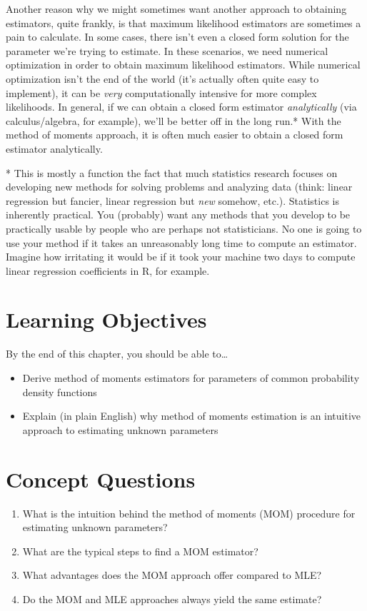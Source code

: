 \documentclass[
  letterpaper,
  DIV=11,
  numbers=noendperiod]{scrreprt}
\begin{document}
Another reason why we might sometimes want another approach to obtaining
estimators, quite frankly, is that maximum likelihood estimators are
sometimes a pain to calculate. In some cases, there isn't even a closed
form solution for the parameter we're trying to estimate. In these
scenarios, we need numerical optimization in order to obtain maximum
likelihood estimators. While numerical optimization isn't the end of the
world (it's actually often quite easy to implement), it can be
\emph{very} computationally intensive for more complex likelihoods. In
general, if we can obtain a closed form estimator \emph{analytically}
(via calculus/algebra, for example), we'll be better off in the long
run.* With the method of moments approach, it is often much easier to
obtain a closed form estimator analytically.

* This is mostly a function the fact that much statistics research
focuses on developing new methods for solving problems and analyzing
data (think: linear regression but fancier, linear regression but
\emph{new} somehow, etc.). Statistics is inherently practical. You
(probably) want any methods that you develop to be practically usable by
people who are perhaps not statisticians. No one is going to use your
method if it takes an unreasonably long time to compute an estimator.
Imagine how irritating it would be if it took your machine two days to
compute linear regression coefficients in R, for example.

\section{Learning Objectives}\label{learning-objectives-2}

By the end of this chapter, you should be able to\ldots{}

\begin{itemize}
\item
  Derive method of moments estimators for parameters of common
  probability density functions
\item
  Explain (in plain English) why method of moments estimation is an
  intuitive approach to estimating unknown parameters
\end{itemize}

\section{Concept Questions}\label{concept-questions-2}

\begin{enumerate}
\def\labelenumi{\arabic{enumi}.}
\item
  What is the intuition behind the method of moments (MOM) procedure for
  estimating unknown parameters?
\item
  What are the typical steps to find a MOM estimator?
\item
  What advantages does the MOM approach offer compared to MLE?
\item
  Do the MOM and MLE approaches always yield the same estimate?
\end{enumerate}
\end{document}
